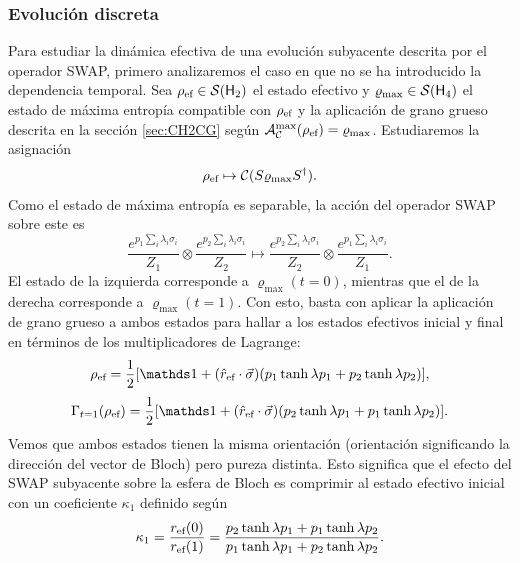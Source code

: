 \subsubsection{Evolución discreta}

Para estudiar la dinámica efectiva de una evolución subyacente descrita por el operador SWAP, primero analizaremos el caso en que no se ha introducido la dependencia temporal. Sea $\rho_{\text{ef}}\in\mathcal{S}({\sf H}_{2})$ el estado efectivo y $\varrho_{\max}\in\mathcal{S}({\sf H}_{4})$ el estado de máxima entropía compatible con $\rho_{\text{ef}}$ y la aplicación de grano grueso descrita en la sección \ref{sec:CH2CG} según $\mathcal{A}_{\mathcal{C}}^{\max}(\rho_{\text{ef}})=\varrho_{\max}$. Estudiaremos la asignación
\begin{equation}
  \rho_{\text{ef}}\mapsto \mathcal{C}(S \varrho_{\max} S^{\dag}).
\end{equation}
Como el estado de máxima entropía es separable, la acción del operador SWAP sobre este es
\begin{equation*}
  \frac{e^{p_{1}\sum_{i}\lambda_{i}\sigma_{i}}}{Z_{1}} \otimes \frac{e^{p_{2}\sum_{i}\lambda_{i}\sigma_{i}}}{Z_{2}}\mapsto\frac{e^{p_{2}\sum_{i}\lambda_{i}\sigma_{i}}}{Z_{2}}\otimes\frac{e^{p_{1}\sum_{i}\lambda_{i}\sigma_{i}}}{Z_{1}}.
\end{equation*}
El estado de la izquierda corresponde a $\varrho_{\max}(t=0)$, mientras que el de la derecha corresponde a $\varrho_{\max}(t=1)$. Con esto, basta con aplicar la aplicación de grano grueso a ambos estados para hallar a los estados efectivos inicial y final en términos de los multiplicadores de Lagrange:
\begin{equation}
\rho_{\ef}=\frac{1}{2}[\Id+(\hat{r}_{\ef}\cdot\vec{\sigma})(p_{1}\tanh{\lambda p_{1}}+p_{2}\tanh{\lambda p_{2}})],
\end{equation}
\begin{equation}
\Gamma_{t=1}(\rho_{\ef})=\frac{1}{2}[\Id+(\hat{r}_{\ef}\cdot\vec{\sigma})(p_{2}\tanh{\lambda p_{1}}+p_{1}\tanh{\lambda p_{2}})].
\end{equation}
Vemos que ambos estados tienen la misma orientación (orientación significando la dirección del vector de Bloch) pero pureza distinta. Esto significa que el efecto del \textsc{SWAP} subyacente sobre la esfera de Bloch es comprimir al estado efectivo inicial con un coeficiente $\kappa_{1}$ definido según
\begin{equation}\label{eq:SWAPFactor}
  \kappa_{1}=\frac{r_{\text{ef}}(0)}{r_{\text{ef}}(1)}=\frac{p_{2}\tanh{\lambda p_{1}}+p_{1}\tanh{\lambda p_{2}}}{
    p_{1}\tanh{\lambda p_{1}}+p_{2}\tanh{\lambda p_{2}}}.
\end{equation}
